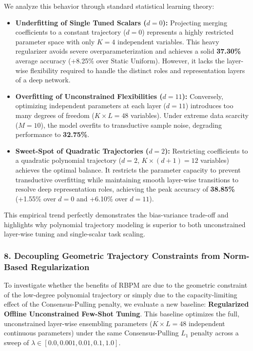 We analyze this behavior through standard statistical learning theory:
\begin{itemize}
    \item \textbf{Underfitting of Single Tuned Scalars ($d = 0$):} Projecting merging coefficients to a constant trajectory ($d = 0$) represents a highly restricted parameter space with only $K = 4$ independent variables. This heavy regularizer avoids severe overparameterization and achieves a solid \textbf{37.30\%} average accuracy (+8.25\% over Static Uniform). However, it lacks the layer-wise flexibility required to handle the distinct roles and representation layers of a deep network.
    \item \textbf{Overfitting of Unconstrained Flexibilities ($d = 11$):} Conversely, optimizing independent parameters at each layer ($d = 11$) introduces too many degrees of freedom ($K \times L = 48$ variables). Under extreme data scarcity ($M = 10$), the model overfits to transductive sample noise, degrading performance to \textbf{32.75\%}.
    \item \textbf{Sweet-Spot of Quadratic Trajectories ($d = 2$):} Restricting coefficients to a quadratic polynomial trajectory ($d = 2$, $K \times (d+1) = 12$ variables) achieves the optimal balance. It restricts the parameter capacity to prevent transductive overfitting while maintaining smooth layer-wise transitions to resolve deep representation roles, achieving the peak accuracy of \textbf{38.85\%} (+1.55\% over $d=0$ and +6.10\% over $d=11$).
\end{itemize}
This empirical trend perfectly demonstrates the bias-variance trade-off and highlights why polynomial trajectory modeling is superior to both unconstrained layer-wise tuning and single-scalar task scaling.

\subsubsection{8. Decoupling Geometric Trajectory Constraints from Norm-Based Regularization}
\label{subsubsec:decoupling_trajectory}
To investigate whether the benefits of RBPM are due to the geometric constraint of the low-degree polynomial trajectory or simply due to the capacity-limiting effect of the Consensus-Pulling penalty, we evaluate a new baseline: \textbf{Regularized Offline Unconstrained Few-Shot Tuning}. This baseline optimizes the full, unconstrained layer-wise ensembling parameters ($K \times L = 48$ independent continuous parameters) under the same Consensus-Pulling $L_1$ penalty across a sweep of $\lambda \in [0.0, 0.001, 0.01, 0.1, 1.0]$. 

